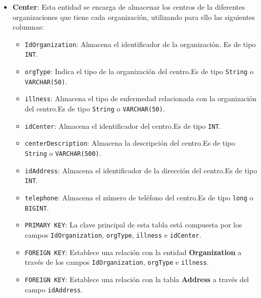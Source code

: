 \begin{itemize}
    \item \textbf{Center}: Esta entidad se encarga de almacenar los centros de la diferentes organizaciones que tiene cada organización, utilizando para ello las siguientes columnas:
        \begin{itemize}
        \item \texttt{IdOrganization}: Almacena el identificador de la organización. Es de tipo \texttt{INT}.
        \item \texttt{orgType}: Indica el tipo de la organización del centro.Es de tipo \texttt{String} o \texttt{VARCHAR(50)}.
        \item \texttt{illness}: Almacena el tipo de enfermedad relacionada con la organización del centro.Es de tipo \texttt{String} o \texttt{VARCHAR(50)}.
        \item \texttt{idCenter}: Almacena el identificador del centro.Es de tipo \texttt{INT}.
        \item \texttt{centerDescription}: Almacena la descripción del centro.Es de tipo \texttt{String} o \texttt{VARCHAR(500)}.
        \item \texttt{idAddress}: Almacena el identificador de la dirección del centro.Es de tipo \texttt{INT}.
        \item \texttt{telephone}: Almacena el número de teléfono del centro.Es de tipo \texttt{long} o \texttt{BIGINT}.
        \item \texttt{PRIMARY KEY}: La clave principal de esta tabla está compuesta por los campos \texttt{IdOrganization}, \texttt{orgType}, \texttt{illness} e \texttt{idCenter}.
        \item \texttt{FOREIGN KEY}: Establece una relación con la entidad \textbf{Organization} a través de los campos \texttt{IdOrganization}, \texttt{orgType} e \texttt{illness}.
        \item \texttt{FOREIGN KEY}: Establece una relación con la tabla \textbf{Address} a través del campo \texttt{idAddress}.
        \end{itemize}


\end{itemize}
